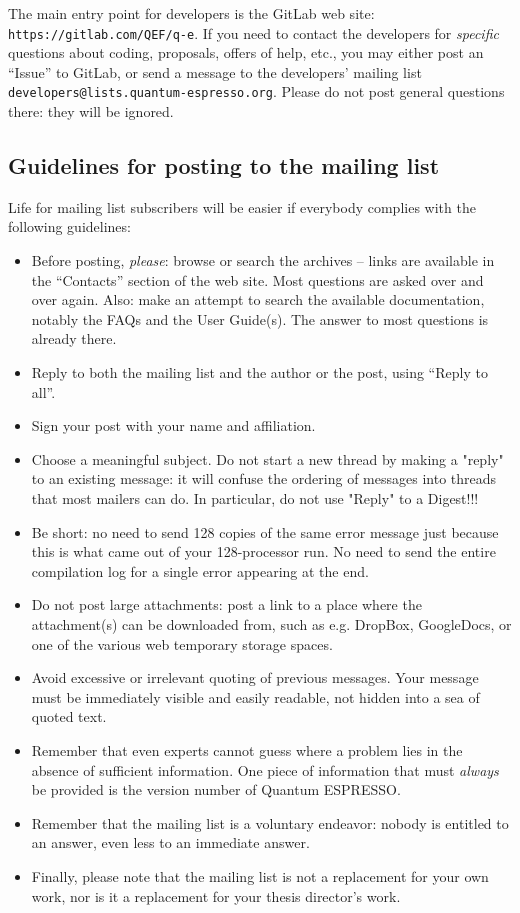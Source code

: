 \documentclass[12pt,a4paper]{article}
\def\qe{{\sc Quantum ESPRESSO}}
\begin{document}
The main entry point for developers is the GitLab web site:
\texttt{https://gitlab.com/QEF/q-e}.
If you need to contact the developers for {\em specific} questions
about coding, proposals, offers of help, etc., you may either post
an ``Issue'' to GitLab, or send a message
to the developers' mailing list \texttt{developers@lists.quantum-espresso.org}.
Please do not post general questions there: they will be ignored.

\subsection{Guidelines for posting to the mailing list}
\label{SubSec:Guidelines}
Life for mailing list subscribers will be easier if everybody
complies with the following guidelines:
\begin{itemize}
\item Before posting, {\em please}: browse or search the archives --
  links are available in the ``Contacts'' section  of the   web site.
  Most questions are asked over and over again. Also: make an attempt
  to search the
  available documentation, notably the FAQs and the User Guide(s).
  The answer to most questions is already there.
\item Reply to both the mailing list and the author or the post, using
  ``Reply to all''.
\item Sign your post with your name and affiliation.
\item Choose a meaningful subject. Do not start a new thread by making
      a	"reply" to an existing message: it will confuse the ordering of
      messages into threads that most mailers can do. In particular, do
      not use "Reply" to a Digest!!!
\item Be short: no need to send 128 copies of the same error message just
  because this is what came out of your 128-processor run. No need to
  send the entire compilation log for a single error appearing at the end.
\item Do not post large attachments: post a link to a place where the
  attachment(s) can be downloaded from, such as e.g. DropBox, GoogleDocs,
  or one of the various web temporary storage spaces.
\item Avoid excessive or irrelevant quoting of previous messages. Your
  message must be immediately visible and easily readable, not hidden
  into a sea of quoted text.
\item Remember that even experts cannot guess where a problem lies in
  the absence of sufficient information. One piece of information that
  must {\em always} be provided is the version number of \qe.
\item Remember that the mailing list is a voluntary endeavor: nobody is
  entitled to an answer, even less to an immediate answer.
\item Finally, please note that the mailing list is not a replacement
  for your own work, nor is it a replacement for your thesis director's
  work.
\end{itemize}
\end{document}
